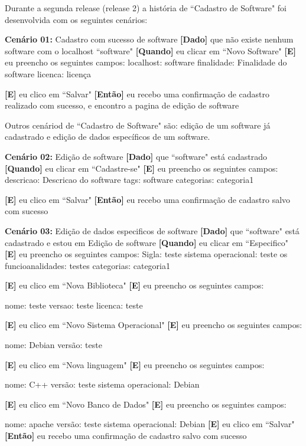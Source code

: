 Durante a segunda release (release 2) a história de ``Cadastro de Software" foi desenvolvida com os seguintes cenários:

\textbf{Cenário 01:} Cadastro com sucesso de software
	\textbf{[Dado]} que não existe nenhum software com o localhost ``software"
	\textbf{[Quando]} eu clicar em ``Novo Software"
	\textbf{[E]} eu preencho os seguintes campos: 
  		localhost: software 
  		finalidade: Finalidade do software
  		licenca: licença
  		
  		
	\textbf{[E]} eu clico em ``Salvar"
	\textbf{[Então]} eu recebo uma confirmação de cadastro realizado com sucesso, e encontro a pagina de edição de software


Outros cenáriod de ``Cadastro de Software" são: edição de um software já cadastrado e edição de dados específicos de um software.

\textbf{Cenário 02:} Edição de software
	\textbf{[Dado]} que ``software" está cadastrado
	\textbf{[Quando]} eu clicar em ``Cadastre-se"
	\textbf{[E]} eu preencho os seguintes campos: 
  		descricao: Descricao do software 
  		tags: software
  		categorias: categoria1
 
	\textbf{[E]} eu clico em ``Salvar"
	\textbf{[Então]} eu recebo uma confirmação de cadastro salvo com sucesso


\textbf{Cenário 03:} Edição de dados especificos de software
	\textbf{[Dado]} que ``software" está cadastrado e estou em Edição de software
	\textbf{[Quando]} eu clicar em ``Especifico"
	\textbf{[E]} eu preencho os seguintes campos: 
  		Sigla: teste 
  		sistema operacional: teste os
  		funcioanalidades: testes
  		categorias: categoria1
 	
 	\textbf{[E]} eu clico em ``Nova Biblioteca"
 	\textbf{[E]} eu preencho os seguintes campos: 

 		nome: teste
 		versao: teste
 		licenca: teste

 	\textbf{[E]} eu clico em ``Novo Sistema Operacional"
 	\textbf{[E]} eu preencho os seguintes campos: 

 		nome: Debian
 		versão: teste

 	\textbf{[E]} eu clico em ``Nova linguagem"
 	\textbf{[E]} eu preencho os seguintes campos: 

 		nome: C++
 		versão: teste
 		sistema operacional: Debian

 	\textbf{[E]} eu clico em ``Novo Banco de Dados"
 	\textbf{[E]} eu preencho os seguintes campos: 

 		nome: apache
 		versão: teste
 		sistema operacional: Debian
	\textbf{[E]} eu clico em ``Salvar"
	\textbf{[Então]} eu recebo uma confirmação de cadastro salvo com sucesso


